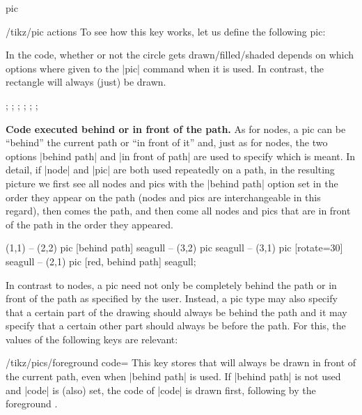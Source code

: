 \begin{pathoperation}{pic}{%
    }
\begin{key}{/tikz/pic actions}
    To see how this key works, let us define the following pic:
\begin{codeexample}
\end{codeexample}
    In the code, whether or not the circle gets drawn/filled/shaded
    depends on which options where given to the |pic| command when it
    is used. In contrast, the rectangle will always (just) be drawn.
\begin{codeexample}[width=6cm]
\tikz {}; \space
\tikz {}; \space
\tikz {}; \space
\tikz {}; \space
\tikz {}; \space
\tikz {};
\end{codeexample}
  \end{key}
  
  \medskip
  \textbf{Code executed behind or in front of the path.}
  As for nodes, a pic can be ``behind'' the current path or ``in front
  of it'' and, just as for nodes, the two options |behind path| and
  |in front of path| are used to specify which is meant. In detail, if
  |node| and |pic| are both used repeatedly on a path, in the
  resulting picture we first see all nodes and pics with the
  |behind path| option set in the order they appear on the path (nodes
  and pics are interchangeable in this regard), then comes the path,
  and then come all nodes and pics that are in front of the path in
  the order they appeared.
\begin{codeexample}[]
\tikz \fill [fill=blue!20]
     (1,1)
  -- (2,2) pic [behind path]      {seagull}
  -- (3,2) pic                    {seagull}
  -- (3,1) pic [rotate=30]        {seagull}
  -- (2,1) pic [red, behind path] {seagull};
\end{codeexample}
  In contrast to nodes, a pic need not only be completely behind
  the path or in front of the path as specified by the user. Instead,
  a pic type may also specify that a certain part of the drawing
  should always be behind the path and it may specify that a certain
  other part should always be before the path. For this, the values of
  the following keys are relevant:
  
  \begin{key}{/tikz/pics/foreground code=}
    This key stores  that will always be drawn in front of
    the current path, even when |behind path| is used. If
    |behind path| is not used and |code| is (also) set, the code of
    |code| is 
    drawn first, following by the foreground .
  \end{key}
  

\end{pathoperation}
